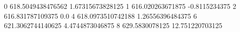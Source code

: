 0 618.5049438476562 1.67315673828125
1 616.020263671875 -0.8115234375
2 616.831787109375 0.0
4 618.0973510742188 1.26556396484375
6 621.3062744140625 4.4744873046875
8 629.5830078125 12.751220703125
